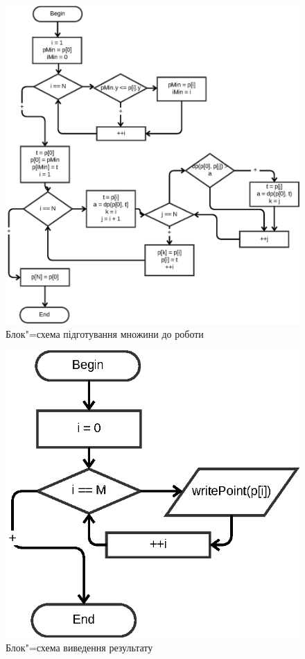 \documentclass[simple,14pt,utf8,ukrainian]{eskdtext}
\begin{document}
    \begin{figure}[h]
      \begin{center}
        \includegraphics{sort.eps}
      \end{center}
      \caption{Блок"=схема підготування множини до роботи}
      \label{fig:sort}
    \end{figure}

    \begin{figure}[h]
      \begin{center}
        \includegraphics{output.eps}
      \end{center}
      \caption{Блок"=схема виведення результату}
      \label{fig:output}
    \end{figure}
    \clearpage
\end{document}
